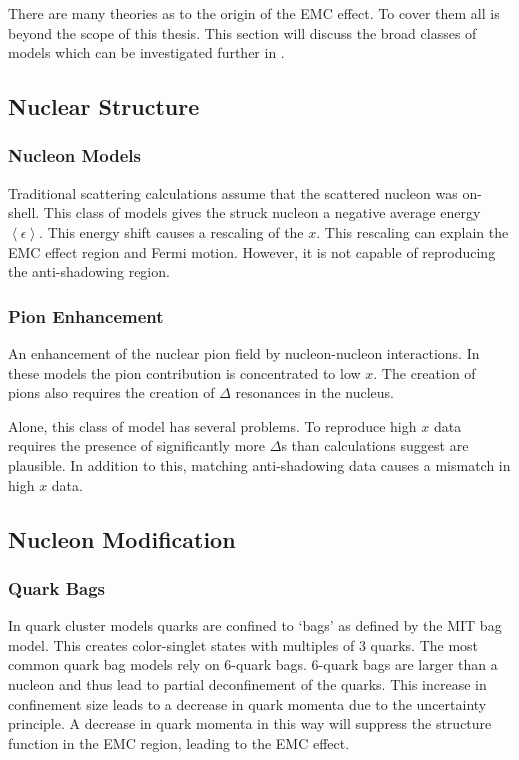 There are many theories as to the origin of the EMC effect. To cover them all is beyond the scope of this thesis. This section will discuss the broad classes of models which can be investigated further in \cite{Norton,GST,HenSRC}.

\subsection{Nuclear Structure}

\subsubsection{Nucleon Models}

Traditional scattering calculations assume that the scattered nucleon was on-shell. This class of models gives the struck nucleon a negative average energy $\left\langle\epsilon\right\rangle$. This energy shift causes a rescaling of the $x$. This rescaling can explain the EMC effect region and Fermi motion. However, it is not capable of reproducing the anti-shadowing region.

\subsubsection{Pion Enhancement}

An enhancement of the nuclear pion field by nucleon-nucleon interactions. In these models the pion contribution is concentrated to low $x$. The creation of pions also requires the creation of $\Delta$ resonances in the nucleus. 

Alone, this class of model has several problems. To reproduce high $x$ data requires the presence of significantly more $\Delta$s than calculations suggest are plausible. In addition to this, matching anti-shadowing data causes a mismatch in high $x$ data.

\subsection{Nucleon Modification}

\subsubsection{Quark Bags}

In quark cluster models quarks are confined to `bags' as defined by the MIT bag model. This creates color-singlet states with multiples of 3 quarks. The most common quark bag models rely on 6-quark bags. 6-quark bags are larger than a nucleon and thus lead to partial deconfinement of the quarks. This increase in confinement size leads to a decrease in quark momenta due to the uncertainty principle. A decrease in quark momenta in this way will suppress the structure function in the EMC region, leading to the EMC effect. \cite{Norton,HenSRC}

